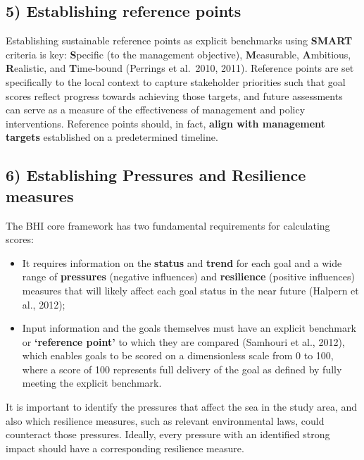 \documentclass[
]{book}
\providecommand{\tightlist}{%
  \setlength{\itemsep}{0pt}\setlength{\parskip}{0pt}}
\begin{document}
\hypertarget{establishing-reference-points}{%
\subsection*{5) Establishing reference points}\label{establishing-reference-points}}

Establishing sustainable reference points as explicit benchmarks using \textbf{SMART} criteria is key: \textbf{S}pecific (to the management objective), \textbf{M}easurable, \textbf{A}mbitious, \textbf{R}ealistic, and \textbf{T}ime-bound (Perrings et al.~2010, 2011). Reference points are set specifically to the local context to capture stakeholder priorities such that goal scores reflect progress towards achieving those targets, and future assessments can serve as a measure of the effectiveness of management and policy interventions. Reference points should, in fact, \textbf{align with management targets} established on a predetermined timeline.

\hypertarget{establishing-pressures-and-resilience-measures}{%
\subsection*{6) Establishing Pressures and Resilience measures}\label{establishing-pressures-and-resilience-measures}}

The BHI core framework has two fundamental requirements for calculating scores:

\begin{itemize}
\tightlist
\item
  It requires information on the \textbf{status} and \textbf{trend} for each goal and a wide range of \textbf{pressures} (negative influences) and \textbf{resilience} (positive influences) measures that will likely affect each goal status in the near future (Halpern et al., 2012);
\item
  Input information and the goals themselves must have an explicit benchmark or \textbf{`reference point'} to which they are compared (Samhouri et al., 2012), which enables goals to be scored on a dimensionless scale from 0 to 100, where a score of 100 represents full delivery of the goal as defined by fully meeting the explicit benchmark.
\end{itemize}

It is important to identify the pressures that affect the sea in the study area, and also which resilience measures, such as relevant environmental laws, could counteract those pressures. Ideally, every pressure with an identified strong impact should have a corresponding resilience measure.
\end{document}
